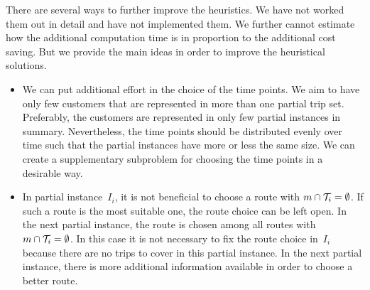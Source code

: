 There are several ways to further improve the heuristics. We have not worked them out in detail and have not implemented them. We further cannot estimate how the additional computation time is in proportion to the additional cost saving. But we provide the main ideas in order to improve the heuristical solutions.
\begin{itemize}
	\item
We can put additional effort in the choice of the time points. We aim to have only few customers that are represented in more than one partial trip set. Preferably, the customers are represented in only few partial instances in summary. Nevertheless, the time points should be distributed evenly over time such that the partial instances have more or less the same size. We can create a supplementary subproblem for choosing the time points in a desirable way.
	\item
In partial instance~$I_i$, it is not beneficial to choose a route with ${m\cap\mathcal{T}_i=\emptyset}$. If such a route is the most suitable one, the route choice can be left open. In the next partial instance, the route is chosen among all routes with ${m\cap\mathcal{T}_i=\emptyset}$. In this case it is not necessary to fix the route choice in~$I_i$ because there are no trips to cover in this partial instance. In the next partial instance, there is more additional information available in order to choose a better route.
\end{itemize}


